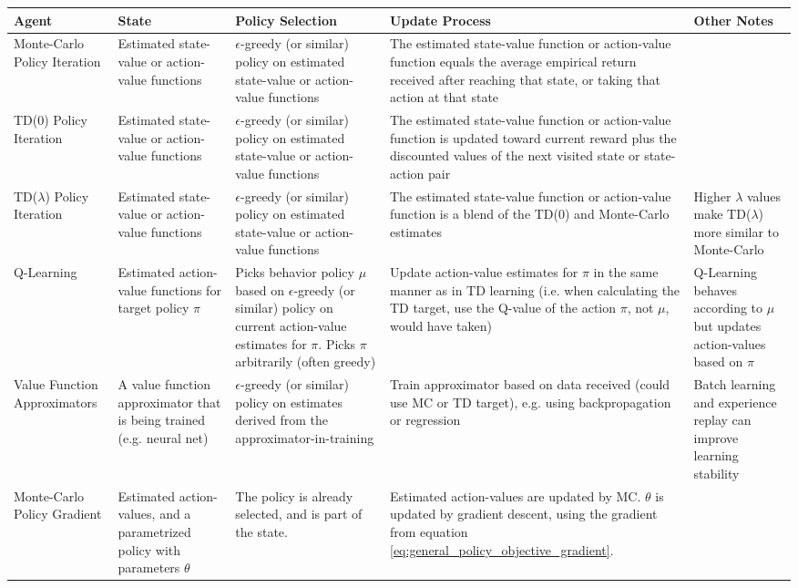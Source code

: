 \documentclass{article}
\begin{document}
\begin{table}[htbp]
\begin{tabular}{|m{1.7cm}|m{2.8cm}|m{3cm}|m{4.5cm}|m{2.33cm}|}
\hline
Agent & State & Policy Selection & Update Process & Other Notes \\ \hline
Monte-Carlo Policy Iteration & Estimated state-value or action-value functions & $\epsilon$-greedy (or similar) policy on estimated state-value or action-value functions & The estimated state-value function or action-value function equals the average empirical return received after reaching that state, or taking that action at that state &  \\ \hline
TD(0) Policy Iteration & Estimated state-value or action-value functions & $\epsilon$-greedy (or similar) policy on estimated state-value or action-value functions & The estimated state-value function or action-value function is updated toward current reward plus the discounted values of the next visited state or state-action pair &  \\ \hline
TD($\lambda$) Policy Iteration & Estimated state-value or action-value functions & $\epsilon$-greedy (or similar) policy on estimated state-value or action-value functions & The estimated state-value function or action-value function is a blend of the TD(0) and Monte-Carlo estimates & Higher $\lambda$ values make TD($\lambda$) more similar to Monte-Carlo \\ \hline
Q-Learning & Estimated action-value functions for target policy $\pi$ & Picks behavior policy $\mu$ based on $\epsilon$-greedy (or similar) policy on current action-value estimates for $\pi$. Picks $\pi$ arbitrarily (often greedy) & Update action-value estimates for $\pi$ in the same manner as in TD learning (i.e. when calculating the TD target, use the Q-value of the action $\pi$, not $\mu$, would have taken) & Q-Learning behaves according to $\mu$ but updates action-values based on $\pi$ \\ \hline
Value Function Approximators & A value function approximator that is being trained (e.g. neural net) & $\epsilon$-greedy (or similar) policy on estimates derived from the approximator-in-training & Train approximator based on data received (could use MC or TD target), e.g. using backpropagation or regression & Batch learning and experience replay can improve learning stability \\ \hline
Monte-Carlo Policy Gradient & Estimated action-values, and a parametrized policy with parameters $\theta$ & The policy is already selected, and is part of the state. & Estimated action-values are updated by MC. $\theta$ is updated by gradient descent, using the gradient from equation \eqref{eq:general_policy_objective_gradient}. &  \\ \hline

\end{tabular}
\end{table}
\end{document}
